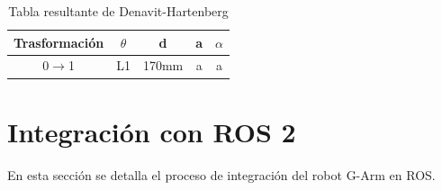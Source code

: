 \begin{table}[H]
\begin{center}
\begin{tabular}{|c|c|c|c|c|}
\hline
\textbf{Trasformación} & \textbf{$\theta$} & \textbf{d} & \textbf{a} & \textbf{$\alpha$}\\
\hline
0$\rightarrow$1 & L1 & 170mm & a & a \\
\hline
\end{tabular}
\caption{Tabla resultante de Denavit-Hartenberg}
\label{cuadro:tablaDH}
\end{center}
\end{table}


\section{Integración con ROS 2}
En esta sección se detalla el proceso de integración del robot G-Arm en \acs{ROS}.


